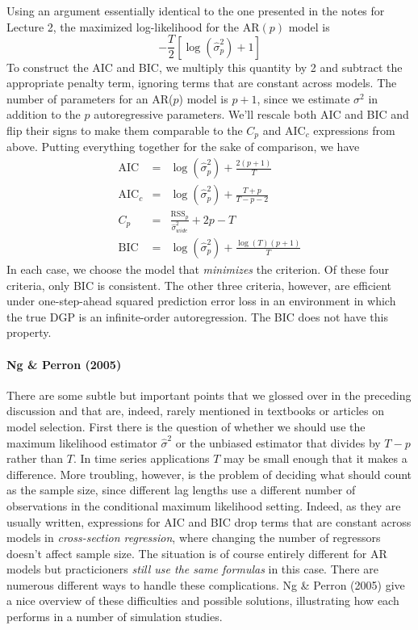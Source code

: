 \documentclass[12pt]{article}
\theoremstyle{definition}
\begin{document}
Using an argument essentially identical to the one presented in the notes for Lecture 2, the maximized log-likelihood for the AR$(p)$ model is
	$$-\frac{T}{2}\left[\log\left(\widehat{\sigma}^2_p \right) + 1\right]$$
To construct the AIC and BIC, we multiply this quantity by 2 and subtract the appropriate penalty term, ignoring terms that are constant across models. The number of parameters for an AR($p$) model is $p+1$, since we estimate $\sigma^2$ in addition to the $p$ autoregressive parameters. We'll rescale both AIC and BIC and flip their signs to make them comparable to the $C_p$ and AIC$_c$ expressions from above. Putting everything together for the sake of comparison, we have
\begin{eqnarray*}
	\mbox{AIC} &=& \log\left(\widehat{\sigma}^2_p \right) + \frac{2(p+1)}{T}\\
	\mbox{AIC}_c &=&  \log\left(\widehat{\sigma}^2_p \right) + \frac{T+p}{T-p-2}\\
	C_p &=&  \frac{\mbox{RSS}_p}{\widehat{\sigma}^2_{wide}} + 2p- T\\
	\mbox{BIC} &=&\log\left(\widehat{\sigma}^2_p \right) + \frac{ \log(T)(p+1)}{T}
\end{eqnarray*}
In each case, we choose the model that \emph{minimizes} the criterion. Of these four criteria, only BIC is consistent. The other three criteria, however, are efficient under one-step-ahead squared prediction error loss in an environment in which the true DGP is an infinite-order autoregression. The BIC does not have this property.


\paragraph{Ng \& Perron (2005)} There are some subtle but important points that we glossed over in the preceding discussion and that are, indeed, rarely mentioned in textbooks or articles on model selection. First there is the question of whether we should use the maximum likelihood estimator $\widehat{\sigma}^2$ or the unbiased estimator that divides by $T-p$ rather than $T$. In time series applications $T$ may be small enough that it makes a difference. More troubling, however, is the problem of deciding what should count as the sample size, since different lag lengths use a different number of observations in the conditional maximum likelihood setting. Indeed, as they are usually written, expressions for AIC and BIC drop terms that are constant across models in \emph{cross-section regression}, where changing the number of regressors doesn't affect sample size. The situation is of course entirely different for AR models but practicioners \emph{still use the same formulas} in this case. There are numerous different ways to handle these complications. Ng \& Perron (2005) give a nice overview of these difficulties and possible solutions, illustrating how each performs in a number of simulation studies.
\end{document}
